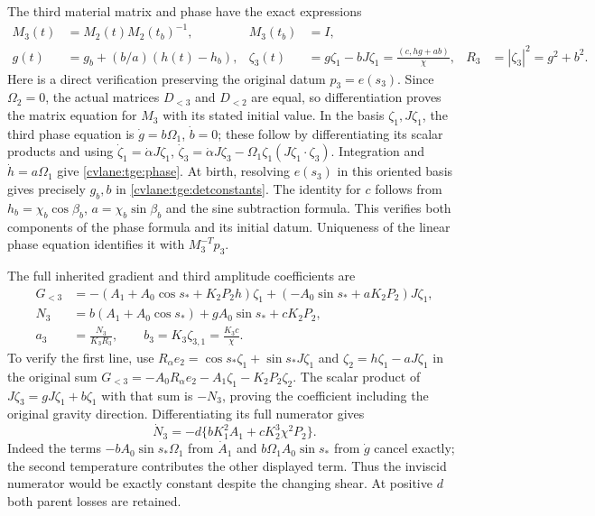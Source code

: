 The third material matrix and phase have the exact expressions
\begin{align}
 M_3(t)&=M_2(t)M_2(t_b)^{-1},& M_3(t_b)&=I,\nonumber\\
 g(t)&=g_b+(b/a)(h(t)-h_b),&
 \zeta_3(t)&=g\zeta_1-bJ\zeta_1
       =\frac{(c,hg+ab)}{\chi},& R_3&=|\zeta_3|^2=g^2+b^2.
 \label{cvlane:tge:phase}
\end{align}
Here is a direct verification preserving the original datum
$p_3=e(s_3)$. Since $\Omega_2=0$, the actual matrices
$D_{<3}$ and $D_{<2}$ are equal, so differentiation proves the
matrix equation for $M_3$ with its stated initial value.
In the basis $\zeta_1,J\zeta_1$, the third phase equation is
$\dot g=b\Omega_1$, $\dot b=0$; these follow by differentiating
its scalar products and using
$\dot\zeta_1=\dot\alpha J\zeta_1$,
$\dot\zeta_3=\dot\alpha J\zeta_3
 -\Omega_1\zeta_1(J\zeta_1\cdot\zeta_3)$.
Integration and $\dot h=a\Omega_1$ give \eqref{cvlane:tge:phase}.
At birth, resolving $e(s_3)$ in this oriented basis gives precisely
$g_b,b$ in \eqref{cvlane:tge:detconstants}. The identity for $c$ follows
from $h_b=\chi_b\cos\beta_b$, $a=\chi_b\sin\beta_b$ and
the sine subtraction formula. This verifies both components of the
phase formula and its initial datum. Uniqueness of the linear phase
equation identifies it with $M_3^{-T}p_3$.

The full inherited gradient and third amplitude coefficients are
\begin{align}
 G_{<3}&=-(A_1+A_0\cos s_*+K_2P_2h)\zeta_1
              +(-A_0\sin s_*+aK_2P_2)J\zeta_1,\nonumber\\
 N_3&=b(A_1+A_0\cos s_*)+gA_0\sin s_*+cK_2P_2,\nonumber\\
 a_3&=\frac{N_3}{K_3R_3},\qquad
 b_3=K_3\zeta_{3,1}=\frac{K_3c}{\chi}.
 \label{cvlane:tge:coefficients}
\end{align}
To verify the first line, use
$R_\alpha e_2=\cos s_*\zeta_1+\sin s_*J\zeta_1$ and
$\zeta_2=h\zeta_1-aJ\zeta_1$ in the original sum
$G_{<3}=-A_0R_\alpha e_2-A_1\zeta_1-K_2P_2\zeta_2$.
The scalar product of $J\zeta_3=gJ\zeta_1+b\zeta_1$ with
that sum is $-N_3$, proving the coefficient including the original
gravity direction. Differentiating its full numerator gives
\begin{equation}\label{cvlane:tge:Ndot}
 \dot N_3=-d\{bK_1^2A_1+cK_2^3\chi^2P_2\}.
\end{equation}
Indeed the terms $-bA_0\sin s_*\Omega_1$ from $\dot A_1$
and $b\Omega_1 A_0\sin s_*$ from $\dot g$ cancel exactly;
the second temperature contributes the other displayed term.
Thus the inviscid numerator would be exactly constant despite the
changing shear. At positive $d$ both parent losses are retained.

